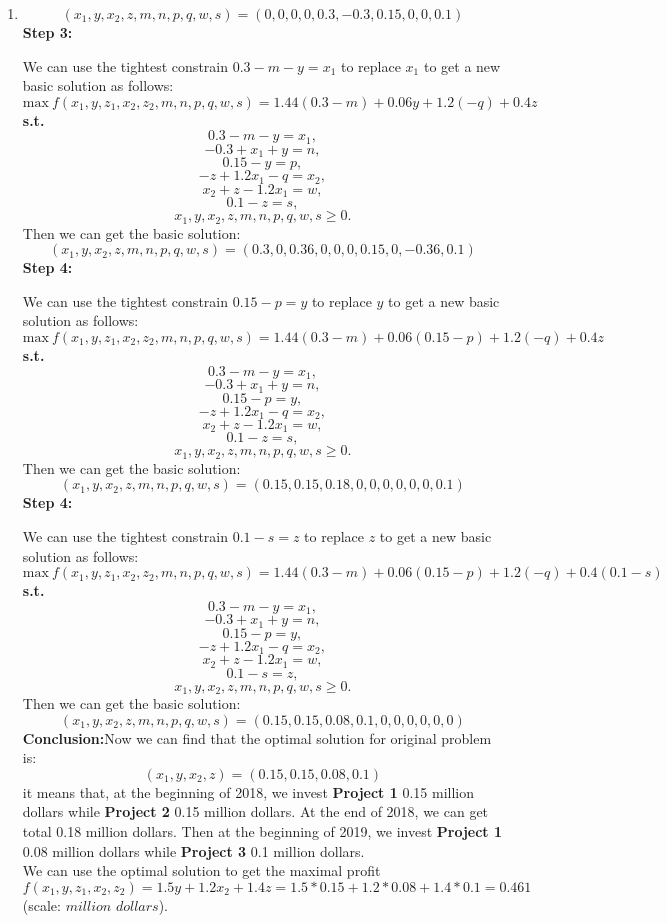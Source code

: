 \documentclass[12pt,a4paper]{article}
\makeatletter
\newtheorem*{solution}{Solution}
\theoremstyle{definition}
\renewenvironment{solution}[1][Solution] {\par\pushQED{\qed}\normalfont\topsep6\p@\@plus6\p@\relax\trivlist\item[\hskip\labelsep\bfseries#1\@addpunct{.}]\ignorespaces}{\popQED\endtrivlist\@endpefalse} \makeatother
\makeatother
\begin{document}
\begin{enumerate}
\begin{solution}
\begin{itemize}
            $$(x_1,y,x_2,z,m,n,p,q,w,s)=(0,0,0,0,0.3,-0.3,0.15,0,0,0.1)$$
            \textbf{Step 3:}\par
        	We can use the tightest constrain $0.3-m-y = x_1$ to replace $x_1$ to get a new basic solution as follows:
        	$$\text{max}\ f(x_1,y,z_1,x_2,z_2,m,n,p,q,w,s)=1.44(0.3-m)+0.06y+1.2(-q)+0.4z$$
            \textbf{s.t.}
            $$0.3-m-y = x_1,$$
            $$-0.3+x_1+y = n,$$
            $$0.15-y  = p,$$
            $$-z+1.2x_1-q=x_2,$$
            $$x_2+z-1.2x_1=w,$$
            $$0.1-z = s,$$
            $$x_1,y,x_2,z,m,n,p,q,w,s \geq 0.$$
            Then we can get the basic solution:
            $$(x_1,y,x_2,z,m,n,p,q,w,s)=(0.3,0,0.36,0,0,0,0.15,0,-0.36,0.1)$$
            \textbf{Step 4:}\par
        	We can use the tightest constrain $0.15-p  = y$ to replace $y$ to get a new basic solution as follows:
        	$$\text{max}\ f(x_1,y,z_1,x_2,z_2,m,n,p,q,w,s)=1.44(0.3-m)+0.06(0.15-p)+1.2(-q)+0.4z$$
            \textbf{s.t.}
            $$0.3-m-y = x_1,$$
            $$-0.3+x_1+y = n,$$
            $$0.15-p  = y,$$
            $$-z+1.2x_1-q=x_2,$$
            $$x_2+z-1.2x_1=w,$$
            $$0.1-z = s,$$
            $$x_1,y,x_2,z,m,n,p,q,w,s \geq 0.$$
            Then we can get the basic solution:
            $$(x_1,y,x_2,z,m,n,p,q,w,s)=(0.15,0.15,0.18,0,0,0,0,0,0,0.1)$$
            \textbf{Step 4:}\par
        	We can use the tightest constrain $0.1-s = z$ to replace $z$ to get a new basic solution as follows:
        	$$\text{max}\ f(x_1,y,z_1,x_2,z_2,m,n,p,q,w,s)=1.44(0.3-m)+0.06(0.15-p)+1.2(-q)+0.4(0.1-s)$$
            \textbf{s.t.}
            $$0.3-m-y = x_1,$$
            $$-0.3+x_1+y = n,$$
            $$0.15-p  = y,$$
            $$-z+1.2x_1-q=x_2,$$
            $$x_2+z-1.2x_1=w,$$
            $$0.1-s = z,$$
            $$x_1,y,x_2,z,m,n,p,q,w,s \geq 0.$$
            Then we can get the basic solution:
            $$(x_1,y,x_2,z,m,n,p,q,w,s)=(0.15,0.15,0.08,0.1,0,0,0,0,0,0)$$
            \textbf{Conclusion:}Now we can find that the optimal solution for original problem is: 
            $$(x_1,y,x_2,z)=(0.15,0.15,0.08,0.1)$$ it means that, at the beginning of 2018, we invest \textbf{Project 1} 0.15 million dollars while \textbf{Project 2} 0.15 million dollars. At the end of 2018, we can get total 0.18 million dollars. Then at the beginning of 2019, we invest \textbf{Project 1} 0.08 million dollars while \textbf{Project 3} 0.1 million dollars.\\
            We can use the optimal solution to get the maximal profit $$f(x_1,y,z_1,x_2,z_2)=1.5y+1.2x_2+1.4z=1.5*0.15+1.2*0.08+1.4*0.1=0.461$$(scale: $million$ $dollars$).


\end{itemize}
\end{solution}
\end{enumerate}
\end{document}
